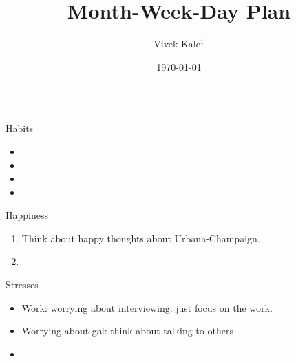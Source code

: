 \documentclass[serif, mathserif, final]{beamer}
\title{Month-Week-Day Plan}
\author{Vivek Kale$^1$}
\institute{$^1$ University of Illinois at Urbana-Champaign}
\date{\today}
\begin{document}
    

\begin{frame}
  \begin{columns}
    \begin{column}{0.25\linewidth} %
      \begin{block}{Habits}
        \begin{itemize}
          \tiny \item \tiny 
        \item \tiny 
        \item \tiny 
        \item \tiny 
        \end{itemize}
      \end{block}
      \begin{block}{Happiness} 
        \begin{enumerate}
          \tiny \item \tiny Think about happy thoughts about
          Urbana-Champaign. 
        \item \tiny 
        \end{enumerate}
      \end{block} 

      \begin{block}{Stresses}
        \begin{itemize}
        \item \tiny Work: worrying about interviewing: just
          focus on the work. 
        \item \tiny Worrying about gal: think about talking to
          others 
        \item \tiny 
        \end{itemize}
      \end{block}


\end{column}
\end{columns}
\end{frame}
\end{document}
